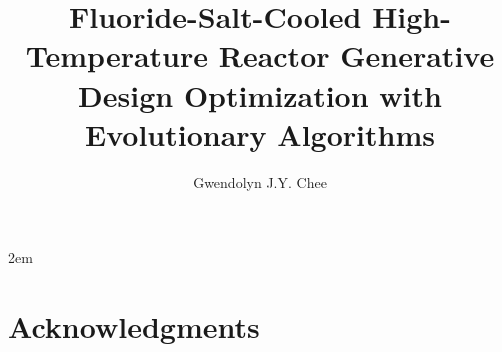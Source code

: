 \documentclass[edeposit,fullpage,11pt]{uiucthesis2009}
\title{Fluoride-Salt-Cooled High-Temperature Reactor Generative Design Optimization with Evolutionary Algorithms}
\author{Gwendolyn J.Y. Chee}
\begin{document}

%
\maketitle
\justify
\parindent 2em%

%

\begin{abstract}
    
\end{abstract}

%
\chapter*{Acknowledgments}

																		
			
%
\tableofcontents

%

%

%

\end{document}
